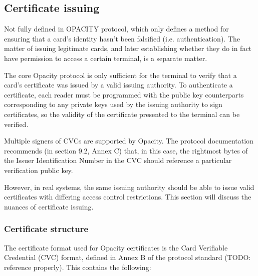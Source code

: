 \documentclass[12pt]{article}
\begin{document}
\subsection{Certificate issuing}
Not fully defined in OPACITY protocol, which only defines a method for ensuring that a card's identity hasn't been falsified (i.e. authentication). The matter of issuing legitimate cards, and later establishing whether they do in fact have permission to access a certain terminal, is a separate matter. 


The core Opacity protocol is only sufficient for the terminal to verify that a card's certificate was issued by a valid issuing authority. To authenticate a certificate, each reader must be programmed with the public key counterparts corresponding to any private keys used by the issuing authority to sign certificates, so the validity of the certificate presented to the terminal can be verified.

Multiple signers of CVCs are supported by Opacity. The protocol documentation recommends (in section 9.2, Annex C) that, in this case, the rightmost bytes of the Issuer Identification Number in the CVC should reference a particular verification public key.


However, in real systems, the same issuing authority should be able to issue valid certificates with differing access control restrictions. This section will discuss the nuances of certificate issuing.


\subsubsection{Certificate structure}
The certificate format used for Opacity certificates is the Card Verifiable Credential (CVC) format, defined in Annex B of the protocol standard (TODO: reference properly). This contains the following:
\end{document}
